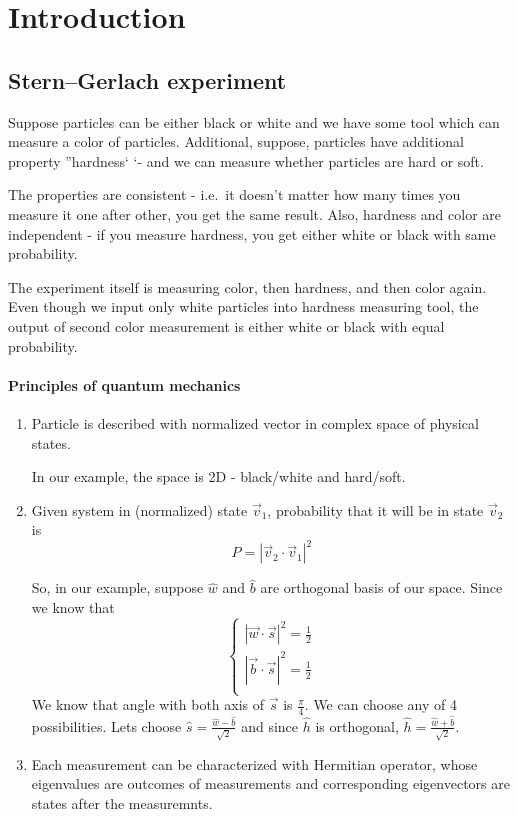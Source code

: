 \section{Introduction}
\subsection{Stern–Gerlach experiment }
Suppose particles can be either black or white and we have some tool which can measure a color of particles. Additional, suppose, particles have additional property ''hardness` `- and we can measure whether particles are hard or soft.

The properties are consistent - i.e.\ it doesn't matter how many times you measure it one after other, you get the same result. Also, hardness and color are independent - if you measure hardness, you get either white or black with same probability.

The experiment itself is measuring color, then hardness, and then color again. Even though we input only white particles into hardness measuring tool, the output of second color measurement is either white or black with equal probability.

\paragraph{Principles of quantum mechanics}
\begin{enumerate}
	\item Particle is described with normalized vector in complex space of physical states.
	
	In our example, the space is 2D - black/white and hard/soft.
	\item Given system in (normalized) state $\vec{v}_1$, probability that it will be in state $\vec{v}_2$ is
	$$P = \left|\vec{v}_2 \cdot \vec{v}_1 \right|^2$$
	
	So, in our example, suppose $\hat{w}$ and $\hat{b}$ are orthogonal basis of our space. Since we know that 
	$$\begin{cases}
	\left|\vec{w} \cdot\vec{s}\right|^2 = \frac{1}{2}\\
	\left|\vec{b} \cdot\vec{s}\right|^2 = \frac{1}{2}\\
	\end{cases}$$
	We know that angle with both axis of $\vec{s}$ is $\frac{\pi}{4}$. We can choose any of 4 possibilities. Lets choose $\hat{s} = \frac{\hat{w} - \hat{b}}{\sqrt{2}}$ and since $\hat{h}$ is orthogonal, $\hat{h} = \frac{\hat{w} + \hat{b}}{\sqrt{2}}$.
\item Each measurement can be characterized with Hermitian operator, whose eigenvalues are outcomes of measurements and corresponding eigenvectors are states after the measuremnts.
\end{enumerate}

